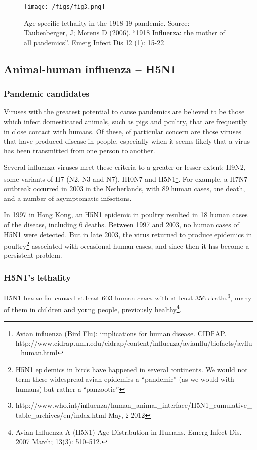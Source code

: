 \documentclass[12pt, a4]{scrartcl}
\begin{document}
\begin{figure}[h]
\centering
\texttt{[image: /figs/fig3.png]}
\caption{Age-specific lethality in the 1918-19 pandemic. Source: Taubenberger, J; Morens D (2006). “1918
Influenza: the mother of all pandemics”. Emerg Infect Dis 12 (1): 15-22}
\end{figure}

\subsection {Animal-human influenza – H5N1}
\subsubsection{Pandemic candidates}
Viruses with the greatest potential to cause pandemics are believed to be those which infect domesticated animals, such as pigs and poultry, that are frequently in close contact with humans. Of these, of particular concern are those viruses that have produced disease in people, especially when it seems likely that a virus has been transmitted from one person to another.

Several influenza viruses meet these criteria to a greater or lesser extent: H9N2, some variants of H7 (N2, N3 and N7), H10N7 and H5N1\footnote{Avian influenza (Bird Flu): implications for human disease. CIDRAP. http://www.cidrap.umn.edu/cidrap/content/influenza/avianflu/biofacts/avflu_human.html}. For example, a H7N7 outbreak occurred in 2003 in the Netherlands, with 89 human cases, one death, and a number of asymptomatic infections.

In 1997 in Hong Kong, an H5N1 epidemic in poultry resulted in 18 human cases of the disease, including 6 deaths. Between 1997 and 2003, no human cases of H5N1 were detected. But in late 2003, the virus returned to produce epidemics in poultry\footnote{H5N1 epidemics in birds have happened in several continents. We would not term these widespread avian epidemics a “pandemic” (as we would with humans) but rather a “panzootic”} associated with occasional human cases, and since then it has become a persistent problem.

\subsubsection {H5N1’s lethality}
H5N1 has so far caused at least 603 human cases with at least 356 deaths\footnote{ http://www.who.int/influenza/human_animal_interface/H5N1_cumulative_table_archives/en/index.html May, 2 2012}, many of them in children and young people, previously healthy\footnote{Avian Influenza A (H5N1) Age Distribution in Humans. Emerg Infect Dis. 2007 March; 13(3): 510–512.}.
\end{document}
